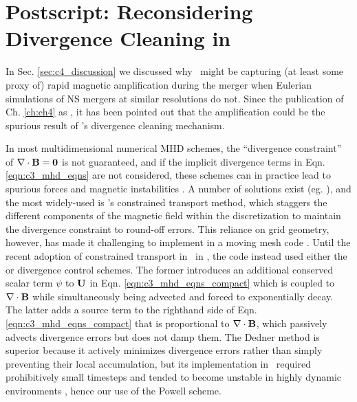 \section{Postscript: Reconsidering Divergence Cleaning in \arepo}
\label{sec:c4_postscript}

In Sec. \ref{sec:c4_discussion} we discussed why \arepo\ might be capturing (at least some proxy of) rapid magnetic amplification during the merger when Eulerian simulations of NS mergers at similar resolutions do not.  Since the publication of Ch. \ref{ch:ch4} as \cite{zhu+15}, it has been pointed out that the amplification could be the spurious result of \arepo's divergence cleaning mechanism.


In most multidimensional numerical MHD schemes, the ``divergence constraint'' of $\bf{\nabla\cdot B} = 0$ is not guaranteed, and if the implicit divergence terms in Eqn. \ref{eqn:c3_mhd_eqns} are not considered, these schemes can in practice lead to spurious forces and magnetic instabilities \citep{toth00, hopkr16}.  A number of solutions exist (eg. \citealt{toth00}), and the most widely-used is \cite{evanh88}'s constrained transport method, which staggers the different components of the magnetic field within the discretization to maintain the divergence constraint to round-off errors.  This reliance on grid geometry, however, has made it challenging to implement in a moving mesh code \citep{moczvh14}.  Until the recent adoption of constrained transport in \arepo\ in \citep{mocz+16}, the code instead used either the \cite{dedn+02} or \cite{powe+99} divergence control schemes.  The former introduces an additional conserved scalar term $\psi$ to ${\bf U}$ in Eqn. \ref{eqn:c3_mhd_eqns_compact} which is coupled to $\bf{\nabla\cdot B}$ while simultaneously being advected and forced to exponentially decay.  The latter adds a source term to the righthand side of Eqn. \ref{eqn:c3_mhd_eqns_compact} that is proportional to $\bf{\nabla\cdot B}$, which passively advects divergence errors but does not damp them.  The Dedner method is superior because it actively minimizes divergence errors rather than simply preventing their local accumulation, but its implementation in \arepo\ required prohibitively small timesteps and tended to become unstable in highly dynamic environments \citep{pakms13}, hence our use of the Powell scheme.

